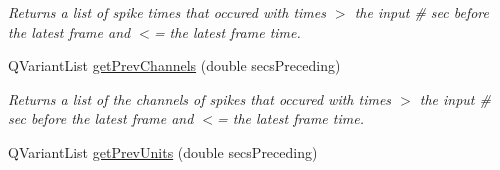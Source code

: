 \begin{DoxyCompactItemize}
\begin{DoxyCompactList}\small\item\em Returns a list of spike times that occured with times $>$ the input \# sec before the latest frame and $<$= the latest frame time. \end{DoxyCompactList}\item 
\hypertarget{class_picto_1_1_analysis_spike_data_aa1122c333d6dc3199879ac5f9262e859}{Q\-Variant\-List \hyperlink{class_picto_1_1_analysis_spike_data_aa1122c333d6dc3199879ac5f9262e859}{get\-Prev\-Channels} (double secs\-Preceding)}\label{class_picto_1_1_analysis_spike_data_aa1122c333d6dc3199879ac5f9262e859}

\begin{DoxyCompactList}\small\item\em Returns a list of the channels of spikes that occured with times $>$ the input \# sec before the latest frame and $<$= the latest frame time. \end{DoxyCompactList}\item 
\hypertarget{class_picto_1_1_analysis_spike_data_af11c5f4e5b0ffdcc587650d2fa01103e}{Q\-Variant\-List \hyperlink{class_picto_1_1_analysis_spike_data_af11c5f4e5b0ffdcc587650d2fa01103e}{get\-Prev\-Units} (double secs\-Preceding)}\label{class_picto_1_1_analysis_spike_data_af11c5f4e5b0ffdcc587650d2fa01103e}


\end{DoxyCompactItemize}

